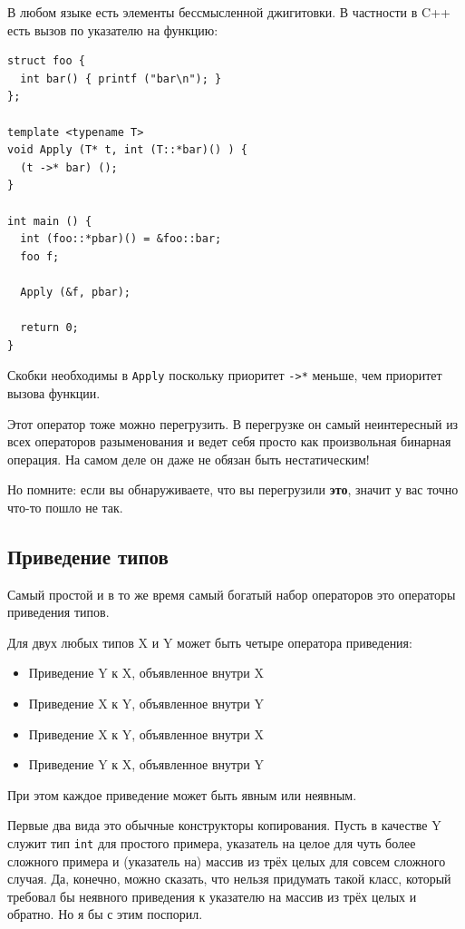 \documentclass[a4paper,12pt,oneside]{book}
\begin{document}
В любом языке есть элементы бессмысленной джигитовки. В частности в C++ есть вызов по указателю на функцию:

\begin{lstlisting}
struct foo {
  int bar() { printf ("bar\n"); }
};

template <typename T>
void Apply (T* t, int (T::*bar)() ) {
  (t ->* bar) ();
}

int main () {
  int (foo::*pbar)() = &foo::bar;
  foo f;

  Apply (&f, pbar);

  return 0;
}
\end{lstlisting}

Скобки необходимы в \lstinline!Apply! поскольку приоритет \lstinline!->*! меньше, чем приоритет вызова функции.

Этот оператор тоже можно перегрузить. В перегрузке он самый неинтересный из всех операторов разыменования и ведет себя просто как произвольная бинарная операция. На самом деле он даже не обязан быть нестатическим!

Но помните: если вы обнаруживаете, что вы перегрузили \textbf{это}, значит у вас точно что-то пошло не так.

\subsection{Приведение типов}\label{CastOverloading}

Самый простой и в то же время самый богатый набор операторов это операторы приведения типов.

Для двух любых типов X и Y может быть четыре оператора приведения:

\begin{itemize}
\item Приведение Y к X, объявленное внутри X
\item Приведение X к Y, объявленное внутри Y
\item Приведение X к Y, объявленное внутри X
\item Приведение Y к X, объявленное внутри Y
\end{itemize}

При этом каждое приведение может быть явным или неявным.

Первые два вида это обычные конструкторы копирования. Пусть в качестве Y служит тип \lstinline!int! для простого примера, указатель на целое для чуть более сложного примера и (указатель на) массив из трёх целых для совсем сложного случая. Да, конечно, можно сказать, что нельзя придумать такой класс, который требовал бы неявного приведения к указателю на массив из трёх целых и обратно. Но я бы с этим поспорил.
\end{document}
